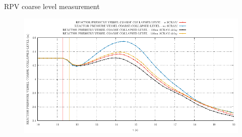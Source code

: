 \begin{frame}{RPV coarse level measurement}
	\begin{figure}
		\centering
		\includegraphics[width=\textwidth]{./01PressureAccident/graphs/REACTOR PRESSURE VESSEL COARSE COLLAPSED LEVEL_comp.pdf}
		
	\end{figure}
	
\end{frame}


